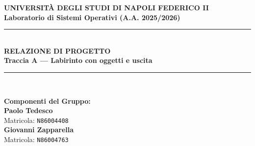\documentclass[11pt,a4paper]{article}
\begin{document}
\begin{titlepage}
    \centering
    {\large \textbf{UNIVERSITÀ DEGLI STUDI DI NAPOLI FEDERICO II}}\\[0.3cm]
    {\small \textbf{Laboratorio di Sistemi Operativi (A.A. 2025/2026)}}\\[1.8cm]

    \rule{\linewidth}{1.2pt}\\[0.5cm]
    {\LARGE \textbf{RELAZIONE DI PROGETTO}}\\[0.3cm]
    {\Large \textbf{Traccia A --- Labirinto con oggetti e uscita}}\\[0.3cm]
    \rule{\linewidth}{1.2pt}\\[2.0cm]

    \begin{minipage}{0.48\textwidth}
        \raggedright
        \textbf{Componenti del Gruppo:}\\[0.4cm]
        \textbf{Paolo Tedesco}\\
        Matricola: \texttt{N86004408}\\
        \textbf{Giovanni Zapparella}\\
        Matricola: \texttt{N86004763}\\
    \end{minipage}
    \hfill
    \begin{minipage}{0.45\textwidth}
        \raggedleft
        \vspace{1cm}
    \end{minipage}


\end{titlepage}
\end{document}
